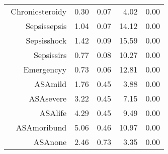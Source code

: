 \begin{tabular}{rrrrr}
$$  Chronic\-steroid\-y & 0.30 & 0.07 & 4.02 & 0.00 \\ 
  Sepsis\-sepsis & 1.04 & 0.07 & 14.12 & 0.00 \\ 
  Sepsis\-shock & 1.42 & 0.09 & 15.59 & 0.00 \\ 
  Sepsis\-sirs & 0.77 & 0.08 & 10.27 & 0.00 \\ 
  Emergency\-y & 0.73 & 0.06 & 12.81 & 0.00 \\ 
  ASA\-mild & 1.76 & 0.45 & 3.88 & 0.00 \\ 
  ASA\-severe & 3.22 & 0.45 & 7.15 & 0.00 \\ 
  ASA\-life & 4.29 & 0.45 & 9.49 & 0.00 \\ 
  ASA\-moribund & 5.06 & 0.46 & 10.97 & 0.00 \\ 
  ASA\-none & 2.46 & 0.73 & 3.35 & 0.00 \\ 
   \hline
\end{tabular}

